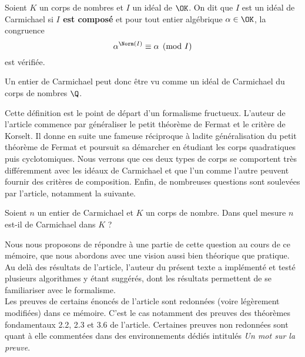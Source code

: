 \begin{definition} Soient $K$ un corps de nombres et $I$ un idéal de $\OK$. On dit que $I$ est un idéal de Carmichael si \textbf{$I$ est composé} et pour tout entier algébrique $\alpha \in \OK$, la congruence
	\begin{equation}\label{congruence-Carmichael}
		\alpha^{\Norm(I)} \equiv \alpha \pmod{I}
	\end{equation}
est vérifiée.
\end{definition}

\begin{remarque}
	Un entier de Carmichael peut donc être vu comme un idéal de Carmichael du corps de nombres $\Q$.
\end{remarque}

Cette définition est le point de départ d'un formalisme fructueux. L'auteur de l'article commence par généraliser le petit théorème de Fermat et le critère de Korselt. Il donne en suite une fameuse réciproque à ladite généralisation du petit théorème de Fermat et poursuit sa démarcher en étudiant les corps quadratiques puis cyclotomiques. Nous verrons que ces deux types de corps se comportent très différemment avec les idéaux de Carmichael et que l'un comme l'autre peuvent fournir des critères de composition. Enfin, de nombreuses questions sont soulevées par l'article, notamment la suivante. \\

\begin{question}\label{question-centrale}Soient $n$ un entier de Carmichael et $K$ un corps de nombre. Dans quel mesure $n$ est-il de Carmichael dans $K$ ?
\end{question}

Nous nous proposons de répondre à une partie de cette question au cours de ce mémoire, que nous abordons avec une vision aussi bien théorique que pratique. Au delà des résultats de l'article, l'auteur du présent texte a implémenté et testé plusieurs algorithmes y étant suggérés, dont les résultats permettent de se familiariser avec le formalisme. \\

Les preuves de certains énoncés de l'article sont redonnées (voire légèrement modifiées) dans ce mémoire. C'est le cas notamment des preuves des théorèmes fondamentaux 2.2, 2.3 et 3.6 de l'article. Certaines preuves non redonnées sont quant à elle commentées dans des environnements dédiés intitulés \textit{Un mot sur la preuve}.
